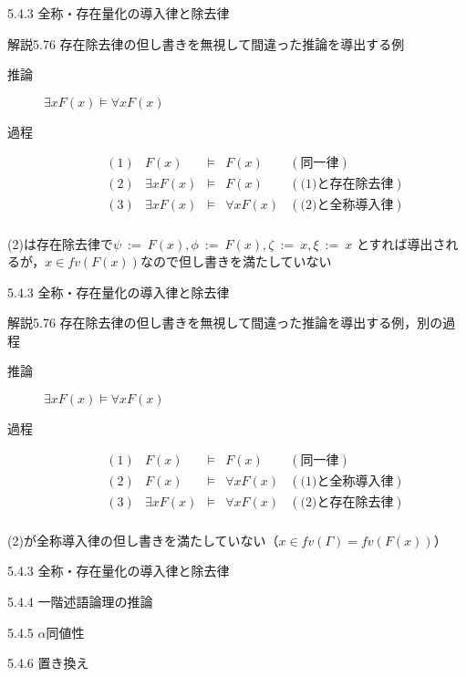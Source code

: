 \documentclass[dvipdfmx,11pt]{beamer}
\begin{document}
\begin{frame}{5.4.3 全称・存在量化の導入律と除去律}
  \begin{block}{解説5.76}
    存在除去律の但し書きを無視して間違った推論を導出する例

    \begin{description}
    \item [推論] \(\exists x F(x) \vDash \forall x F(x) \)
    \item [過程]
      \[
      \begin{array}{rrcll}
        (1) & F(x) & \vDash & F(x) & (\textit{同一律}) \\
        (2) & \exists x F(x) & \vDash & F(x) & (\textit{(1)と存在除去律}) \\
        (3) & \exists x F(x) & \vDash & \forall x F(x) & (\textit{(2)と全称導入律}) \\
      \end{array}
      \]
    \end{description}

    (2)は存在除去律で\(\psi \ := \ F(x), \phi \ := \ F(x), \zeta \ := \ x, \xi \ := \ x\)
    とすれば導出されるが，\(x\in\textit{fv}(F(x))\)なので但し書きを満たしていない
  \end{block}
\end{frame}

\begin{frame}{5.4.3 全称・存在量化の導入律と除去律}
  \begin{block}{解説5.76}
    存在除去律の但し書きを無視して間違った推論を導出する例，別の過程

    \begin{description}
    \item [推論] \(\exists x F(x) \vDash \forall x F(x) \)
    \item [過程]
      \[
      \begin{array}{rrcll}
        (1) & F(x) & \vDash & F(x) & (\textit{同一律}) \\
        (2) & F(x) & \vDash & \forall x F(x) & (\textit{(1)と全称導入律}) \\
        (3) & \exists x F(x) & \vDash & \forall x F(x) & (\textit{(2)と存在除去律}) \\
      \end{array}
      \]
    \end{description}

    (2)が全称導入律の但し書きを満たしていない（\(x\in\textit{fv}(\Gamma)=\textit{fv}(F(x))\)）
  \end{block}
\end{frame}

\begin{frame}{5.4.3 全称・存在量化の導入律と除去律}
\end{frame}

\begin{frame}{5.4.4 一階述語論理の推論}
\end{frame}

\begin{frame}{5.4.5 \(\alpha\)同値性}
\end{frame}

\begin{frame}{5.4.6 置き換え}
\end{frame}
\end{document}
